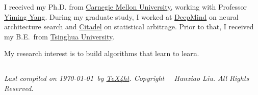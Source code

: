 \documentclass{article}
\begin{document}
\noindent I received my Ph.D. from
\href{http://www.cmu.edu/index.shtml}{Carnegie Mellon University},
working with Professor \href{http://www.cs.cmu.edu/~./yiming/}{Yiming Yang}.
During my graduate study,
I worked at \href{https://deepmind.com/}{DeepMind} on neural architecture search
and \href{https://www.citadel.com/}{Citadel} on statistical arbitrage.
Prior to that,
I received my B.E.\ from
\href{http://www.tsinghua.edu.cn/publish/newthuen/index.html}{Tsinghua University}.

\noindent My research interest is to build algorithms that learn to learn.

\subsection*{}
\footnotesize{
    \textit{
        Last compiled on \today\ by \href{http://www.tug.org/tex4ht/}{\TeX4ht}. \newline
        Copyright \textcopyright\ \the\year\ Hanxiao Liu. All Rights Reserved.
    }
}
\end{document}
